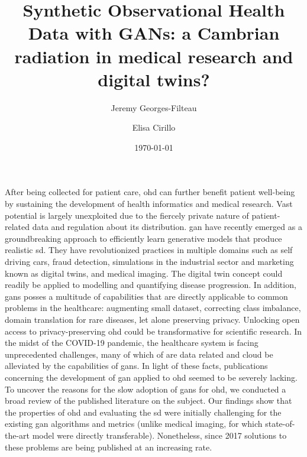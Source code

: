 \documentclass[8pt,acronym]{article}
\renewenvironment{abstract}
 {{\bfseries\noindent{\abstractname}\par\nobreak}\footnotesize}
 {\bigskip}
\begin{document}
    

    \title{Synthetic Observational Health Data with GANs: a Cambrian radiation in medical research and digital twins?}
    
    \author[1,2]{Jeremy Georges-Filteau}%
    \author[2]{Elisa Cirillo}%


    \vspace{-1em}

    \date{\today}

    \begingroup
    \let\center\flushleft
    \let\endcenter\endflushleft
    \maketitle
    \endgroup


    \glsresetall
    \begin{abstract}
    After being collected for patient care, \gls{ohd} can further benefit patient well-being by sustaining the development of health informatics and medical research. Vast potential is largely unexploited due to the fiercely private nature of patient-related data and regulation about its distribution. \gls{gan} have recently emerged as a groundbreaking approach to efficiently learn generative models that produce realistic \gls{sd}. They have revolutionized practices in multiple domains such as self driving cars, fraud detection, simulations in the industrial sector and marketing known as digital twins, and medical imaging. The digital twin concept could readily be applied to modelling and quantifying disease progression. In addition, \glspl{gan} posses a multitude of capabilities that are directly applicable to common problems in the healthcare: augmenting small dataset, correcting class imbalance, domain translation for rare diseases, let alone preserving privacy. Unlocking open access to privacy-preserving \gls{ohd} could be transformative for scientific research. In the midst of the COVID-19 pandemic, the healthcare system is facing unprecedented challenges, many of which of are data related and cloud be alleviated by the capabilities of \glspl{gan}. In light of these facts, publications concerning the development of  \gls{gan} applied to \gls{ohd} seemed to be severely lacking. To uncover the reasons for the slow adoption of \glspl{gan} for \gls{ohd}, we conducted a broad review of the published literature on the subject. Our findings show that the properties of \gls{ohd} and evaluating the \gls{sd} were initially challenging for the existing \gls{gan} algorithms and metrics (unlike medical imaging, for which state-of-the-art model were directly transferable). Nonetheless, since 2017 solutions to these problems are being published at an increasing rate.
    \end{abstract}

    
    
    
    
    
    

    \pagebreak

    \printglossary[type=oalgo]
    \printglossary[type=\acronymtype]

    \pagebreak

    
\end{document}
